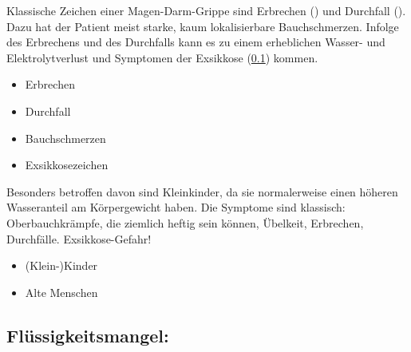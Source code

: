 \Text{\TxSymptome}
{
Klassische Zeichen einer Magen-Darm-Grippe sind Erbrechen
() und Durchfall (). Dazu hat
der Patient meist starke, kaum lokalisierbare
Bauchschmerzen. Infolge des 
Erbrechens und des Durchfalls kann es zu einem erheblichen 
Wasser- und Elektrolytverlust und Symptomen der Exsikkose
(\ref{topic:exsikkose}) kommen. 

}{
\begin{itemize}
    \item Erbrechen 
    \item Durchfall 
    \item Bauchschmerzen
    \item Exsikkosezeichen
\end{itemize}
}{}{}{}

{%
Besonders betroffen davon sind Kleinkinder, da sie
normalerweise einen höheren Wasseranteil am Körpergewicht
haben.  Die Symptome sind klassisch: Oberbauchkrämpfe,
die ziemlich heftig sein können, Übelkeit, Erbrechen, Durchfälle.
Exsikkose-Gefahr! 
}{
\begin{itemize}
    \item (Klein-)Kinder
    \item Alte Menschen
\end{itemize}
}{}{}{}





\subsection{Flüssigkeitsmangel: }
\label{topic:exsikkose}%


